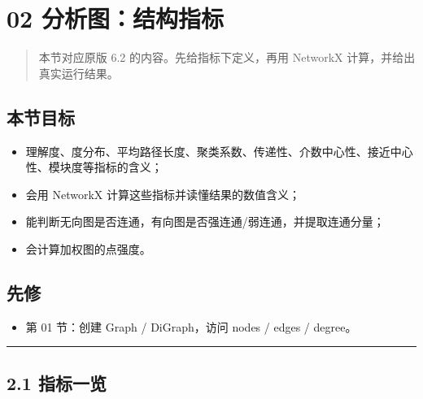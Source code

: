 \section{02
分析图：结构指标}\label{ux5206ux6790ux56feux7ed3ux6784ux6307ux6807}

\begin{quote}
本节对应原版 6.2 的内容。先给指标下定义，再用 NetworkX
计算，并给出真实运行结果。
\end{quote}

\subsection{本节目标}\label{ux672cux8282ux76eeux6807-24}

\begin{itemize}
\tightlist
\item
  理解度、度分布、平均路径长度、聚类系数、传递性、介数中心性、接近中心性、模块度等指标的含义；
\item
  会用 NetworkX 计算这些指标并读懂结果的数值含义；
\item
  能判断无向图是否连通，有向图是否强连通/弱连通，并提取连通分量；
\item
  会计算加权图的点强度。
\end{itemize}

\subsection{先修}\label{ux5148ux4fee-17}

\begin{itemize}
\tightlist
\item
  第 01 节：创建 Graph / DiGraph，访问 nodes / edges / degree。
\end{itemize}

\begin{center}\rule{0.5\linewidth}{0.5pt}\end{center}

\subsection{2.1 指标一览}\label{ux6307ux6807ux4e00ux89c8}


